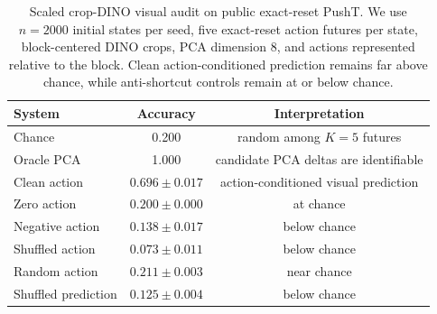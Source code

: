 \begin{table}[t]
\centering
\caption{Scaled crop-DINO visual audit on public exact-reset PushT. We use $n=2000$ initial states per seed, five exact-reset action futures per state, block-centered DINO crops, PCA dimension 8, and actions represented relative to the block. Clean action-conditioned prediction remains far above chance, while anti-shortcut controls remain at or below chance.}
\label{tab:pusht-crop-dino-n2000}
\begin{tabular}{lcc}
\toprule
System & Accuracy & Interpretation \\
\midrule
Chance & 0.200 & random among $K=5$ futures \\
Oracle PCA & 1.000 & candidate PCA deltas are identifiable \\
Clean action & $0.696 \pm 0.017$ & action-conditioned visual prediction \\
Zero action & $0.200 \pm 0.000$ & at chance \\
Negative action & $0.138 \pm 0.017$ & below chance \\
Shuffled action & $0.073 \pm 0.011$ & below chance \\
Random action & $0.211 \pm 0.003$ & near chance \\
Shuffled prediction & $0.125 \pm 0.004$ & below chance \\
\bottomrule
\end{tabular}
\end{table}
